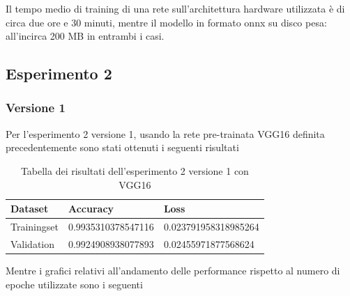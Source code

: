 Il tempo medio di training di una rete sull'architettura hardware utilizzata è di circa due ore e 30 minuti, mentre il modello in formato onnx su disco pesa: all'incirca 200 MB in entrambi i casi.

\subsection{Esperimento 2}

\subsubsection{Versione 1}
Per l'esperimento 2 versione 1, usando la rete pre-trainata VGG16 definita precedentemente sono stati ottenuti i seguenti risultati
\begin{table}[H]
    \begin{tabular}{|l|l|l|}
    \hline
    \textbf{Dataset}     & \textbf{Accuracy}           & \textbf{Loss}                 \\ \hline
    Trainingset & 0.9935310378547116 & 0.023791958318985264 \\ \hline
    Validation  & 0.9924908938077893 & 0.02455971877568624  \\ \hline
    \end{tabular}
   	\caption{\label{tab:esperimento2_v1_risultati}Tabella dei risultati dell'esperimento 2 versione 1 con VGG16}
\end{table}

Mentre i grafici relativi all'andamento delle performance rispetto al numero di epoche utilizzate sono i seguenti

